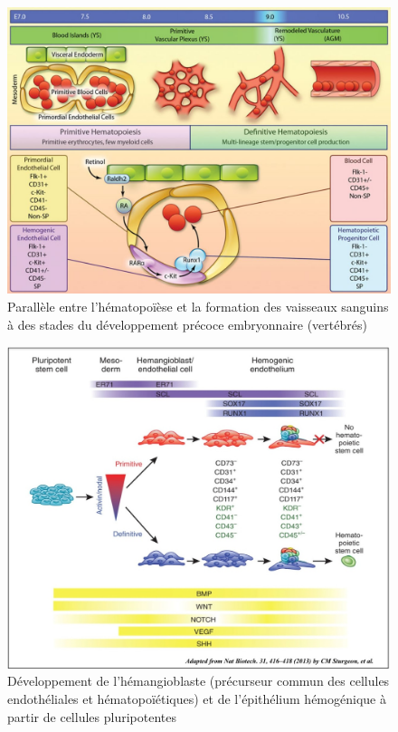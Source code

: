 \documentclass[fleqn,11pt]{SelfArx} %
\begin{document}
\begin{figure}[ht]
\centering
\includegraphics[width=\linewidth]{images/synthese}
\caption{Parallèle entre l'hématopoïèse et la formation des vaisseaux sanguins à des stades du développement précoce embryonnaire (vertébrés)\href{http://circres.ahajournals.org/content/112/9/1272}{\cite{Marcelo}}}
\label{fig:synthese}
\end{figure}


\begin{figure}[ht]
\centering
\includegraphics[width=\linewidth]{images/syntheseSuper}
\caption{Développement de l'hémangioblaste (précurseur commun des cellules endothéliales et hématopoïétiques) et de l'épithélium hémogénique à partir de cellules pluripotentes\href{http://cdn.intechopen.com/pdfs-wm/46823.pdf}{\cite{Chen}}}
\label{fig:syntheseSuper}
\end{figure}
\end{document}
